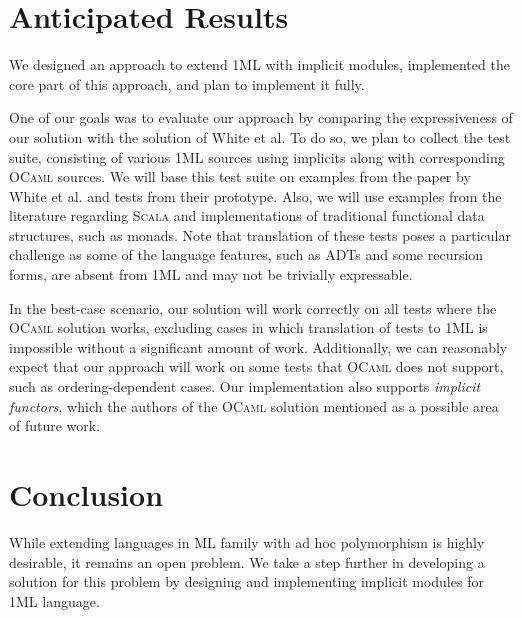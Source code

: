 \documentclass{spbau-diploma}
\begin{document}
\section{Anticipated Results}

We designed an approach to extend \textsc{1ML} with implicit modules, implemented the core part of this approach, and plan to implement it fully.

One of our goals was to evaluate our approach by comparing the expressiveness of our solution with the solution of White et al. To do so, we plan to collect the test suite, consisting of various \textsc{1ML} sources using implicits along with corresponding \textsc{OCaml} sources. We will base this test suite on examples from the paper by White et al. and tests from their prototype. Also, we will use examples from the literature regarding \textsc{Scala} and implementations of traditional functional data structures, such as monads. Note that translation of these tests poses a particular challenge as some of the language features, such as ADTs and some recursion forms, are absent from \textsc{1ML} and may not be trivially expressable. 

In the best-case scenario, our solution will work correctly on all tests where the \textsc{OCaml} solution works, excluding cases in which translation of tests to \textsc{1ML} is impossible without a significant amount of work. Additionally, we can reasonably expect that our approach will work on some tests that \textsc{OCaml} does not support, such as ordering-dependent cases. Our implementation also supports \textit{implicit functors}, which the authors of the \textsc{OCaml} solution mentioned as a possible area of future work.

\section*{Conclusion}

While extending languages in \textsc{ML} family with ad hoc polymorphism is highly desirable, it remains an open problem. We take a step further in developing a solution for this problem by designing and implementing implicit modules for \textsc{1ML} language. 



\end{document}
